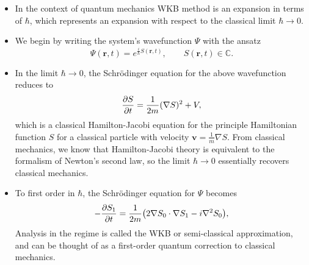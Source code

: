 \documentclass[11pt, a4paper]{article}
\renewcommand{\grad}{\nabla}
\renewcommand{\laplacian}{\nabla^{2}}
\newcommand{\Schro}{Schr\"{o}dinger\xspace}
\renewcommand{\vec}[1]{\bm{#1}}  %
\renewcommand{\r}{\vec{r}}  %
\begin{document}
\begin{itemize}

    \item In the context of quantum mechanics WKB method is an expansion in terms of $ \hbar $, which represents an expansion with respect to the classical limit $ \hbar \to 0 $. 

    \item We begin by writing the system's wavefunction $ \Psi $ with the ansatz 
    \begin{equation*}
        \Psi(\r, t) = e^{\frac{i}{\hbar}S(\r, t)}, \qquad S(\r, t) \in \mathbb{C}.
    \end{equation*}
    
    \item In the limit $ \hbar \to 0 $, the \Schro equation for the above wavefunction reduces to
    \begin{equation*}
        \pdv{S}{t} = \frac{1}{2m}(\grad S)^{2} + V,
    \end{equation*}
    which is a classical Hamilton-Jacobi equation for the principle Hamiltonian function $ S $ for a classical particle with velocity $ \vec{v} = \frac{1}{m}\grad S $. From classical mechanics, we know that Hamilton-Jacobi theory is equivalent to the formalism of Newton's second law, so the limit $ \hbar \to 0 $ essentially recovers classical mechanics.
    
    \item To first order in $ \hbar $, the \Schro equation for $ \Psi $ becomes
    \begin{equation*}
        - \pdv{S_{1}}{t} = \frac{1}{2m} \big( 2 \grad S_{0} \cdot \grad S_{1} - i \laplacian S_{0} \big),
    \end{equation*}
    Analysis in the regime is called the WKB or semi-classical approximation, and can be thought of as a first-order quantum correction to classical mechanics.

\end{itemize}
\end{document}
